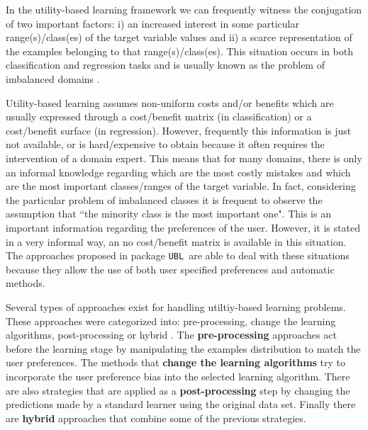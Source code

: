 \documentclass[10pt,a4paper]{article}\usepackage[]{graphicx}\usepackage[]{color}
\newcommand{\UBL}{\texttt{UBL}\ }
\newcommand{\pUBL}{package \texttt{UBL}\ }
\begin{document}
In the utility-based learning framework we can frequently witness the conjugation of two important factors: i) an increased interest in some particular range(s)/class(es) of the target variable values and ii) a scarce representation of the examples belonging to that range(s)/class(es). This situation occurs in both classification and regression tasks and is usually known as the problem of imbalanced domains \cite{branco2015survey}.

Utility-based learning assumes non-uniform costs and/or benefits which are usually expressed through a cost/benefit matrix (in classification) or a cost/benefit surface (in regression). However, frequently this information is just not available, or is hard/expensive to obtain because it often requires the intervention of a domain expert. This means that for many domains, there is only an informal knowledge regarding which are the most costly mistakes and which are the most important classes/ranges of the target variable. In fact, considering the particular problem of imbalanced classes it is frequent to observe the assumption that ``the minority class is the most important one". This is an important information regarding the preferences of the user. However, it is stated in a very informal way, an no cost/benefit matrix is available in this situation. The approaches proposed in \pUBL are able to deal with these situations because they allow the use of both user specified preferences and automatic methods.




Several types of approaches exist for handling utiltiy-based learning problems. These approaches were categorized into: pre-processing, change the learning algorithms, post-processing or hybrid \cite{branco2015survey}. The \textbf{pre-processing} approaches act before the learning stage by manipulating the examples distribution to match the user preferences. The methods that \textbf{change the learning algorithms} try to incorporate the user preference bias into the selected learning algorithm. There are also strategies that are applied as a \textbf{post-processing} step by changing the predictions made by a standard learner using the original data set. Finally there are \textbf{hybrid} approaches that combine some of the previous strategies.
\end{document}
